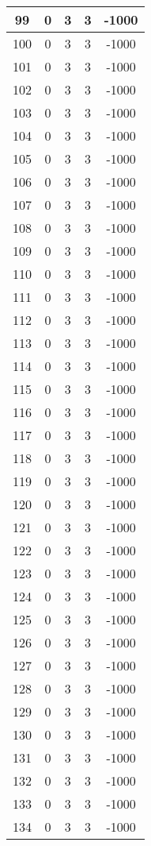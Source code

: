 \documentclass[letterpaper, 12pt]{article}
\begin{document}
\begin{longtable}{|c|c|c|c|c|}
\hline
99 & 0 & 3 & 3 & -1000 \\
\hline
100 & 0 & 3 & 3 & -1000 \\
\hline
101 & 0 & 3 & 3 & -1000 \\
\hline
102 & 0 & 3 & 3 & -1000 \\
\hline
103 & 0 & 3 & 3 & -1000 \\
\hline
104 & 0 & 3 & 3 & -1000 \\
\hline
105 & 0 & 3 & 3 & -1000 \\
\hline
106 & 0 & 3 & 3 & -1000 \\
\hline
107 & 0 & 3 & 3 & -1000 \\
\hline
108 & 0 & 3 & 3 & -1000 \\
\hline
109 & 0 & 3 & 3 & -1000 \\
\hline
110 & 0 & 3 & 3 & -1000 \\
\hline
111 & 0 & 3 & 3 & -1000 \\
\hline
112 & 0 & 3 & 3 & -1000 \\
\hline
113 & 0 & 3 & 3 & -1000 \\
\hline
114 & 0 & 3 & 3 & -1000 \\
\hline
115 & 0 & 3 & 3 & -1000 \\
\hline
116 & 0 & 3 & 3 & -1000 \\
\hline
117 & 0 & 3 & 3 & -1000 \\
\hline
118 & 0 & 3 & 3 & -1000 \\
\hline
119 & 0 & 3 & 3 & -1000 \\
\hline
120 & 0 & 3 & 3 & -1000 \\
\hline
121 & 0 & 3 & 3 & -1000 \\
\hline
122 & 0 & 3 & 3 & -1000 \\
\hline
123 & 0 & 3 & 3 & -1000 \\
\hline
124 & 0 & 3 & 3 & -1000 \\
\hline
125 & 0 & 3 & 3 & -1000 \\
\hline
126 & 0 & 3 & 3 & -1000 \\
\hline
127 & 0 & 3 & 3 & -1000 \\
\hline
128 & 0 & 3 & 3 & -1000 \\
\hline
129 & 0 & 3 & 3 & -1000 \\
\hline
130 & 0 & 3 & 3 & -1000 \\
\hline
131 & 0 & 3 & 3 & -1000 \\
\hline
132 & 0 & 3 & 3 & -1000 \\
\hline
133 & 0 & 3 & 3 & -1000 \\
\hline
134 & 0 & 3 & 3 & -1000 \\

\end{longtable}
\end{document}
